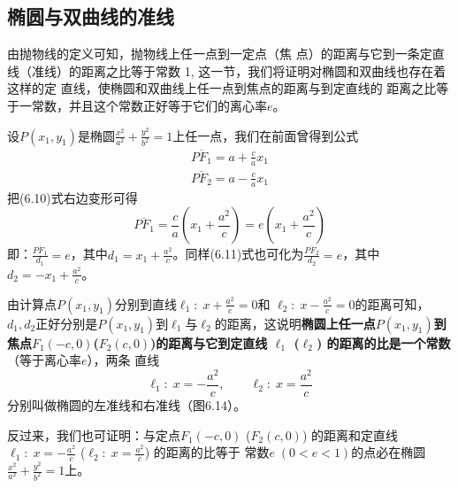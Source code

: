 \subsection{椭圆与双曲线的准线}
由抛物线的定义可知，抛物线上任一点到一定点（焦
点）的距离与它到一条定直线（准线）的距离之比等于常数
1, 这一节，我们将证明对椭圆和双曲线也存在着这样的定
直线，使椭圆和双曲线上任一点到焦点的距离与到定直线的
距离之比等于一常数，并且这个常数正好等于它们的离心率$e$。

设$P(x_1,y_1)$是椭圆$\frac{x^2}{a^2}+\frac{y^2}{b^2}=1$上任一点，我们在前面曾得到公式
\begin{align}
    \overline{PF_1}=a+\frac{c}{a}x_1\\
    \overline{PF_2}=a-\frac{c}{a}x_1
\end{align}
把(6.10)式右边变形可得
\[\overline{PF_1}=\frac{c}{a}\left(x_1+\frac{a^2}{c}\right)=e\left(x_1+\frac{a^2}{c}\right)\]
即：$\frac{\overline{PF_1}}{d_1}=e$，其中$d_1=x_1+\frac{a^2}{c}$。同样(6.11)式也可化为$\frac{\overline{PF_2}}{d_2}=e$，其中$d_2=-x_1+\frac{a^2}{c}$。

由计算点$P(x_1,y_1)$分别到直线$\ell_1:\; x+\frac{a^2}{c}=0$和
$\ell_2:\; x-\frac{a^2}{c}=0$的距离可知，$d_1,d_2$正好分别是$P(x_1,y_1)$到$\ell_1$与$\ell_2$的距离，这说明\textbf{椭圆上任一点$P(x_1,y_1)$到焦点$F_1(-c,0)$($F_2(c,0)$)的距离与它到定直线
$\ell_1$ ($\ell_2$) 的距离的比是一个常数}（等于离心率$e$），两条
直线
\[\ell_1:\; x=-\frac{a^2}{c},\qquad \ell_2:\; x=\frac{a^2}{c}\]
分别叫做椭圆的左准线和右准线（图6.14）。
\begin{figure}[htp]
    \centering
{}
    \caption{}
\end{figure}

反过来，我们也可证明：与定点$F_1(-c,0)$ ($F_2(c,0)$)
的距离和定直线$\ell_1:\; x=-\frac{a^2}{c}$ ($\ell_2:\; x=\frac{a^2}{c}$) 的距离的比等于
常数$e\; (0<e<1)$的点必在椭圆$\frac{x^2}{a^2}+\frac{y^2}{b^2}=1$上。

